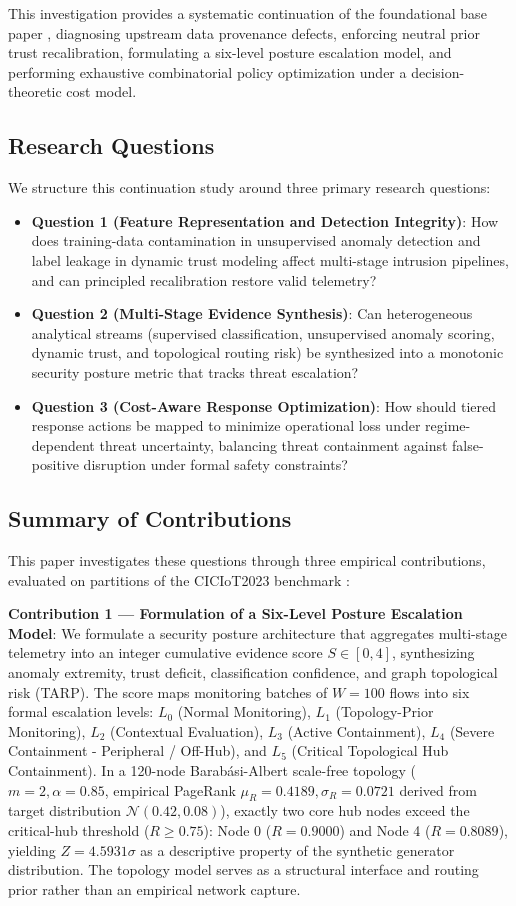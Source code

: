 \documentclass[journal,10pt,onecolumn]{IEEEtran}
\begin{document}
This investigation provides a systematic continuation of the foundational base paper \cite{1}, diagnosing upstream data provenance defects, enforcing neutral prior trust recalibration, formulating a six-level posture escalation model, and performing exhaustive combinatorial policy optimization under a decision-theoretic cost model.

\subsection{Research Questions}
We structure this continuation study around three primary research questions:
\begin{itemize}
    \item \textbf{Question 1 (Feature Representation and Detection Integrity)}: How does training-data contamination in unsupervised anomaly detection and label leakage in dynamic trust modeling affect multi-stage intrusion pipelines, and can principled recalibration restore valid telemetry?
    \item \textbf{Question 2 (Multi-Stage Evidence Synthesis)}: Can heterogeneous analytical streams (supervised classification, unsupervised anomaly scoring, dynamic trust, and topological routing risk) be synthesized into a monotonic security posture metric that tracks threat escalation?
    \item \textbf{Question 3 (Cost-Aware Response Optimization)}: How should tiered response actions be mapped to minimize operational loss under regime-dependent threat uncertainty, balancing threat containment against false-positive disruption under formal safety constraints?
\end{itemize}

\subsection{Summary of Contributions}
This paper investigates these questions through three empirical contributions, evaluated on partitions of the CICIoT2023 benchmark \cite{3}:

\textbf{Contribution 1 --- Formulation of a Six-Level Posture Escalation Model}:
We formulate a security posture architecture that aggregates multi-stage telemetry into an integer cumulative evidence score $S \in [0, 4]$, synthesizing anomaly extremity, trust deficit, classification confidence, and graph topological risk (TARP). The score maps monitoring batches of $W=100$ flows into six formal escalation levels: $L_0$ (Normal Monitoring), $L_1$ (Topology-Prior Monitoring), $L_2$ (Contextual Evaluation), $L_3$ (Active Containment), $L_4$ (Severe Containment - Peripheral / Off-Hub), and $L_5$ (Critical Topological Hub Containment). In a 120-node Barabási-Albert scale-free topology ($m=2, \alpha=0.85$, empirical PageRank $\mu_R = 0.4189, \sigma_R = 0.0721$ derived from target distribution $\mathcal{N}(0.42, 0.08)$), exactly two core hub nodes exceed the critical-hub threshold ($R \ge 0.75$): Node 0 ($R = 0.9000$) and Node 4 ($R = 0.8089$), yielding $Z = 4.5931\sigma$ as a descriptive property of the synthetic generator distribution. The topology model serves as a structural interface and routing prior rather than an empirical network capture.
\end{document}
